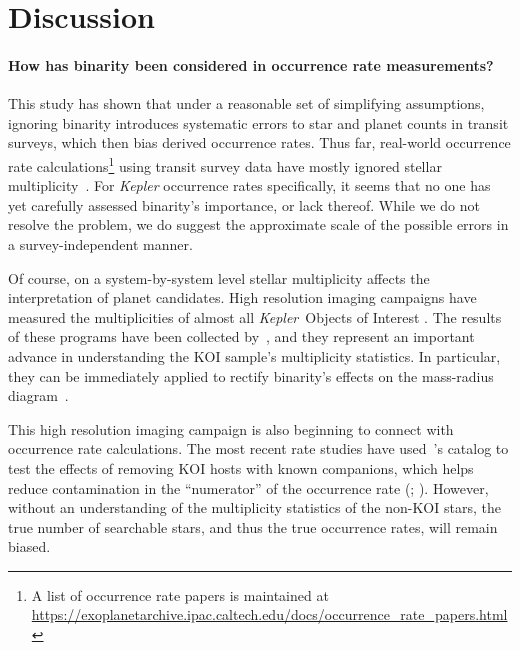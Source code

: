 \documentclass[12pt,modern]{aastex61}
\begin{document}
\section{Discussion}
\label{sec:discussion}


\paragraph{How has binarity been considered in occurrence rate measurements?}
This study has shown that under a reasonable set of simplifying assumptions, 
ignoring binarity introduces systematic errors to star and planet counts in 
transit surveys, which then bias derived occurrence rates.
Thus far, real-world occurrence rate calculations\footnote{
    A list of occurrence rate papers is maintained at 
    \url{https://exoplanetarchive.ipac.caltech.edu/docs/occurrence_rate_papers.html}
} using transit survey data have mostly ignored stellar 
multiplicity~\citep[\textit{e.g.},][]{howard_planet_2012,fressin_false_2013,foreman-mackey_exoplanet_2014,dressing_occurrence_2015,burke_terrestrial_2015}.
For {\it Kepler} occurrence rates specifically, 
it seems that no one has yet carefully assessed binarity's importance, or lack 
thereof.
While we do not resolve the problem, we do suggest the approximate scale of 
the possible errors in a survey-independent manner.

Of course, on a system-by-system level stellar multiplicity affects the 
interpretation of planet candidates. High resolution imaging 
campaigns have measured the multiplicities of almost all {\it Kepler}\ Objects 
of Interest 
\citep{howell_speckle_2011,adams_adaptive_2012,adams_adaptive_2013,horch_observations_2012,
    horch_most_2014,lillo-box_multiplicity_2012,lillo-box_high-resolution_2014,dressing_adaptive_2014,
    law_robotic_2014,cartier_revision_2015,everett_high-resolution_2015,gilliland_hubble_2015,
    wang_influence_2015,wang_influence_2015-1,baranec_robo-ao_2016,ziegler_robo-ao_2017}.
The results of these programs have been collected 
by~\citet{furlan_kepler_2017}, and they represent an important advance in 
understanding the KOI 
sample's multiplicity statistics.
In particular, they can be immediately applied to rectify binarity's effects 
on the mass-radius diagram~\citep{furlan_densities_2017}.

This high resolution imaging campaign is also beginning to connect with
occurrence rate calculations.
The most recent rate studies have used~\citet{furlan_kepler_2017}'s 
catalog to test the effects of removing KOI hosts with known companions, which 
helps reduce contamination in the ``numerator'' of 
the occurrence rate (\citealt{fulton_california-_2017}; 
\citealt{petigura_CKS_2017}).
However, without an understanding of the multiplicity statistics of the 
non-KOI stars, the true number of searchable stars, and thus the true 
occurrence rates, will remain biased.
\end{document}
